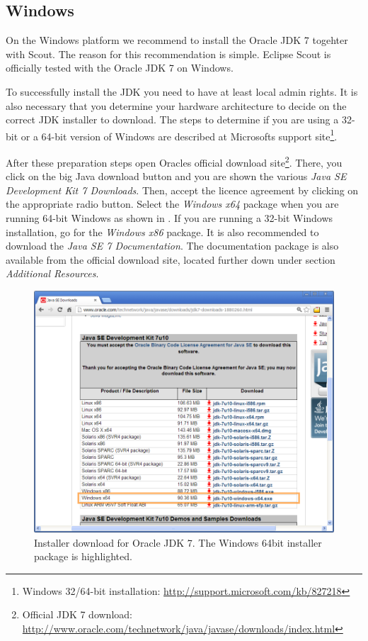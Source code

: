 \documentclass[a4paper,10pt,twoside]{book}
\begin{document}
\subsection{Windows}

On the Windows platform we recommend to install the Oracle JDK 7 togehter with Scout. 
The reason for this recommendation is simple.
Eclipse Scout is officially tested with the Oracle JDK 7 on Windows.

To successfully install the JDK you need to have at least local admin rights.
It is also necessary that you determine your hardware architecture to decide on the correct JDK installer to download. 
The steps to determine if you are using a 32-bit or a 64-bit version of Windows are described at Microsofts support 
site\footnote{Windows 32/64-bit installation: \url{http://support.microsoft.com/kb/827218}}.

After these preparation steps open Oracles official download 
site\footnote{Official JDK 7 download: \url{http://www.oracle.com/technetwork/java/javase/downloads/index.html}}.
There, you click on the big Java download button and you are shown the various \textit{Java SE Development Kit 7 Downloads}.
Then, accept the licence agreement by clicking on the appropriate radio button.
Select the \textit{Windows x64} package when you are running 64-bit Windows as shown in .
If you are running a 32-bit Windows installation, go for the \textit{Windows x86} package.
It is also recommended to download the \textit{Java SE 7 Documentation}.
The documentation package is also available from the official download site, located further down under section \textit{Additional Resources}.

\begin{figure}
\includegraphics[width=15cm]{oracle_jdk_download.png}
\caption{Installer download for Oracle JDK 7. The Windows 64bit installer package is highlighted.}
\end{figure}
\end{document}
